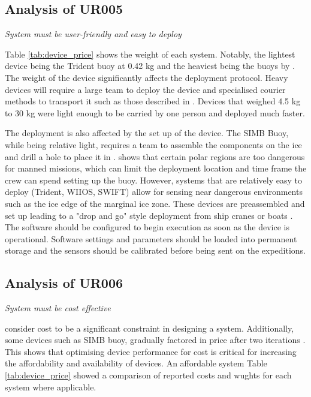 \subsection{Analysis of UR005}

\textit{System must be  user-friendly and easy to deploy}

Table \ref{tab:device_price} shows the weight of each system. Notably, the lightest device being the Trident buoy at 0.42 kg and the heaviest being the buoys by \textcite{doble2017robust}. The weight of the device significantly affects the deployment protocol. Heavy devices will require a large team to deploy the device and specialised courier methods to transport it such as those described in \textcite{doble2017robust}. Devices that weighed 4.5 kg to 30 kg were light enough to be carried by one person and deployed much faster.

The deployment is also affected by the set up of the device. The SIMB Buoy, while being relative light, requires a team to assemble the components on the ice and drill a hole to place it in \cite{PLANCK2019102792}. \textcite{kennicutt2016delivering} shows that certain polar regions are too dangerous for manned missions, which can limit the deployment location and time frame the crew can spend setting up the buoy. However, systems that are relatively easy to deploy (Trident, WIIOS, SWIFT) allow for sensing near dangerous environments such as the ice edge of the marginal ice zone. These devices are preassembled and set up leading to a "drop and go" style deployment from ship cranes \cite{vichi2019effects,alberello2019drift} or boats \cite{rabault2019open,kohout2015device}. The software should be configured to begin execution as soon as the device is operational. Software settings and parameters should be loaded into permanent storage and the sensors should be calibrated before being sent on the expeditions.

\subsection{Analysis of UR006}

\textit{System must be cost effective}

\textcite{PLANCK2019102792,guimaraes2018surface,rabault2019open} consider cost to be a significant constraint in designing a system. Additionally, some devices such as SIMB buoy, gradually factored in price after two iterations \cite{planck2019evolution}. This shows that optimising device performance for cost is critical for increasing the affordability and availability of devices. An affordable system Table \ref{tab:device_price} showed a comparison of reported costs and wughts for each system where applicable.
 
